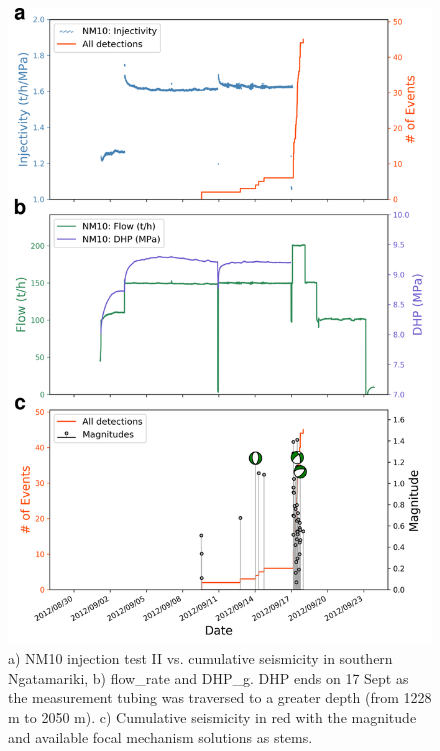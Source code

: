 \begin{figure}[h!]
\begin{center}
\includegraphics[width=0.84\columnwidth]{Chapter_3_Nga/figures/Multiplet_150_vs_flow_cum_NM10_stim/Full_final_cat_flow_mags_FMs_depth_NM10_Stimulation_12-5_GrowClust_labels_no_diff_ABC}
\caption[Seismicity and injection parameters for NM10 stimulation]{{
a) NM10 injection test II vs. cumulative seismicity in southern
Ngatamariki, b) \Gls{flow_rate} and \gls{DHP_g}. \acrshort{DHP} ends on 17 Sept as
the measurement tubing was traversed to a greater depth (from 1228 m to
2050 m). c) Cumulative seismicity in red with the magnitude and
available focal mechanism solutions as stems.
{\label{640752}}%
}}
\end{center}
\end{figure}

